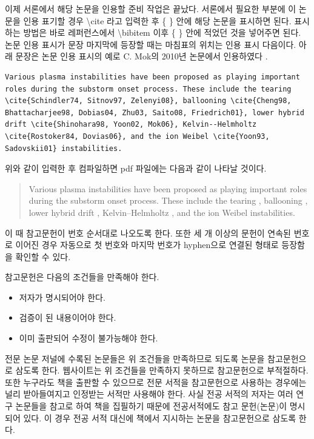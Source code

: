 \documentclass[twoside,11pt]{gshs_thesis}
\begin{document}
이제 서론에서 해당 논문을 인용할 준비 작업은 끝났다. 서론에서 필요한 부분에 이 논문을 인용 표기할 경우 {\textbackslash}cite 라고 입력한 후 \{ \} 안에 해당 논문을 표시하면 된다. 표시하는 방법은 바로 레퍼런스에서 {\textbackslash}bibitem 이후 \{ \} 안에 적었던 것을 넣어주면 된다. 논문 인용 표시가 문장 마지막에 등장할 때는 마침표의 위치는 인용 표시 다음이다. 아래 문장은 논문 인용 표시의 예로 C. Mok의 2010년 논문에서 인용하였다 \cite{Mok10}.
\begin{lstlisting}
Various plasma instabilities have been proposed as playing important roles during the substorm onset process. These include the tearing \cite{Schindler74, Sitnov97, Zelenyi08}, ballooning \cite{Cheng98, Bhattacharjee98, Dobias04, Zhu03, Saito08, Friedrich01}, lower hybrid drift \cite{Shinohara98, Yoon02, Mok06}, Kelvin--Helmholtz \cite{Rostoker84, Dovias06}, and the ion Weibel \cite{Yoon93, Sadovskii01} instabilities.
\end{lstlisting}
위와 같이 입력한 후 컴파일하면 pdf 파일에는 다음과 같이 나타날 것이다.
\begin{quote}
Various plasma instabilities have been proposed as playing important roles during the substorm onset process. These include the tearing \cite{Schindler74, Sitnov97, Zelenyi08}, ballooning \cite{Cheng98, Bhattacharjee98, Dobias04, Zhu03, Saito08, Friedrich01}, lower hybrid drift \cite{Shinohara98, Yoon02, Mok06}, Kelvin--Helmholtz \cite{Rostoker84, Dovias06}, and the ion Weibel \cite{Yoon93, Sadovskii01} instabilities.
\end{quote}
이 때 참고문헌이 번호 순서대로 나오도록 한다. 또한 세 개 이상의 문헌이 연속된 번호로 이어진 경우 자동으로 첫 번호와 마지막 번호가 hyphen으로 연결된 형태로 등장함을 확인할 수 있다.


참고문헌은 다음의 조건들을 만족해야 한다.
\begin{itemize}
\item{저자가 명시되어야 한다.}
\item{검증이 된 내용이어야 한다.}
\item{이미 출판되어 수정이 불가능해야 한다.}
\end{itemize}
전문 논문 저널에 수록된 논문들은 위 조건들을 만족하므로 되도록 논문을 참고문헌으로 삼도록 한다. 웹사이트는 위 조건들을 만족하지 못하므로 참고문헌으로 부적절하다. 또한 누구라도 책을 출판할 수 있으므로 전문 서적을 참고문헌으로 사용하는 경우에는 널리 받아들여지고 인정받는 서적만 사용해야 한다. 사실 전공 서적의 저자는 여러 연구 논문들을 참고로 하여 책을 집필하기 때문에 전공서적에도 참고 문헌(논문)이 명시되어 있다. 이 경우 전공 서적 대신에 책에서 지시하는 논문을 참고문헌으로 삼도록 한다.
\end{document}
